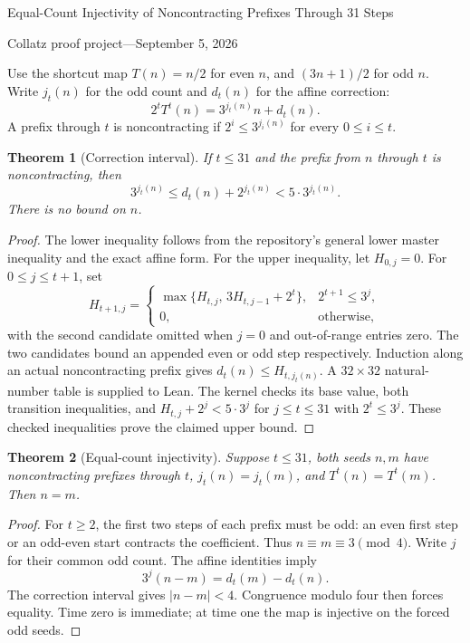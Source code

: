 \documentclass[10pt]{article}
\newtheorem{theorem}{Theorem}
\begin{document}
\begin{center}
{\Large Equal-Count Injectivity of Noncontracting Prefixes Through 31 Steps}\par\medskip
Collatz proof project\quad---\quad September 5, 2026
\end{center}
\begin{abstract}
For every time at most 31 and every pair of natural seeds, noncontracting
prefixes with the same odd count and endpoint have the same seed. Lean
proves this using a small correction-envelope certificate, independently
of the exploratory enumeration. We also certify why the odd-count
hypothesis is essential and why this particular correction bound stops
at 31. No arbitrary-time injectivity or Collatz theorem is claimed.
\end{abstract}
Use the shortcut map $T(n)=n/2$ for even $n$, and $(3n+1)/2$ for odd $n$.
Write $j_t(n)$ for the odd count and $d_t(n)$ for the affine correction:
\[
2^tT^t(n)=3^{j_t(n)}n+d_t(n).
\]
A prefix through $t$ is noncontracting if $2^i\leq3^{j_i(n)}$ for every
$0\leq i\leq t$.

\begin{theorem}[Correction interval]
If $t\leq31$ and the prefix from $n$ through $t$ is noncontracting, then
\[
3^{j_t(n)}\leq d_t(n)+2^{j_t(n)}<5\cdot3^{j_t(n)}.
\]
There is no bound on $n$.
\end{theorem}
\begin{proof}
The lower inequality follows from the repository's general lower master
inequality and the exact affine form. For the upper inequality, let
$H_{0,j}=0$. For $0\leq j\leq t+1$, set
\[
H_{t+1,j}=\begin{cases}
\max\{H_{t,j},\,3H_{t,j-1}+2^t\},&2^{t+1}\leq3^j,\\
0,&\text{otherwise},
\end{cases}
\]
with the second candidate omitted when $j=0$ and out-of-range entries
zero. The two candidates bound an appended even or odd step respectively.
Induction along an actual noncontracting prefix gives
$d_t(n)\leq H_{t,j_t(n)}$.
A $32\times32$ natural-number table is supplied to Lean. The kernel
checks its base value, both transition inequalities, and
$H_{t,j}+2^j<5\cdot3^j$ for $j\leq t\leq31$ with $2^t\leq3^j$.
These checked inequalities prove the claimed upper bound.
\end{proof}

\begin{theorem}[Equal-count injectivity]
Suppose $t\leq31$, both seeds $n,m$ have noncontracting prefixes through
$t$, $j_t(n)=j_t(m)$, and $T^t(n)=T^t(m)$. Then $n=m$.
\end{theorem}
\begin{proof}
For $t\geq2$, the first two steps of each prefix must be odd: an even
first step or an odd-even start contracts the coefficient. Thus
$n\equiv m\equiv3\pmod4$. Write $j$ for their common odd count.
The affine identities imply
\[
3^j(n-m)=d_t(m)-d_t(n).
\]
The correction interval gives $|n-m|<4$. Congruence modulo four then
forces equality. Time zero is immediate; at time one the map is injective
on the forced odd seeds.
\end{proof}
\end{document}
